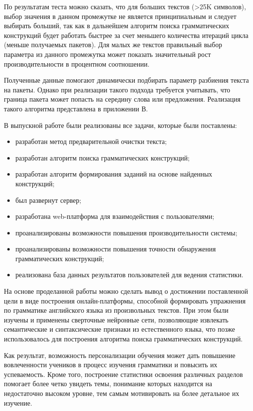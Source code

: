По результатам теста можно сказать, что для больших текстов (>25K символов), выбор значения в данном промежутке не является принципиальным и следует выбирать больший, так как в дальнейшем алгоритм поиска грамматических конструкций будет работать быстрее за счет меньшего количества итераций цикла (меньше получаемых пакетов). Для малых же текстов правильный выбор параметра из данного промежутка может показать значительный рост производительности в процентном соотношении. 

Полученные данные помогают динамически подбирать параметр разбиения текста на пакеты. Однако при реализации такого подхода требуется учитывать, что граница пакета может попасть на середину слова или предложения. Реализация такого алгоритма представлена в приложении В.



\newpage
\Conc
В выпускной работе были реализованы все задачи, которые были поставлены:
\begin{itemize}
  \item разработан метод предварительной очистки текста;
  \item разработан алгоритм поиска грамматических конструкций;
  \item разработан алгоритм формирования заданий на основе найденных конструкций;
  \item был развернут сервер;
  \item разработана web-платформа для взаимодействия с пользователями;
  \item проанализированы возможности повышения производительности системы;
  \item проанализированы возможности повышения точности обнаружения грамматических конструкций;
  \item реализована база данных результатов пользователей для ведения статистики.
\end{itemize}

На основе проделанной работы можно сделать вывод о достижении поставленной цели в виде построения онлайн-платформы, способной формировать упражнения по грамматике английского языка из произвольных текстов. При этом были изучены и применены сверточные нейронные сети, позволяющие извлекать семантические и синтаксические признаки из естественного языка, что позже использовалось для построения алгоритма поиска грамматических конструкций. 

Как результат, возможность персонализации обучения может дать повышение вовлеченности учеников в процесс изучения грамматики и повысить их успеваемость. Кроме того, построение статистики освоения различных разделов помогает более четко увидеть темы, понимание которых находится на недостаточно высоком уровне, тем самым мотивировать на более детальное их изучение.

